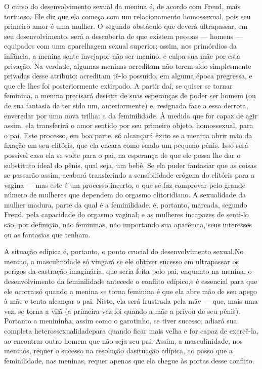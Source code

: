  O curso do desenvolvimento sexual da menina é, de acordo com Freud,
mais tortuoso. Ele diz que ela começa com um relacionamento
homossexual, pois seu primeiro amor é uma mulher. O segundo obstáculo
que deverá ultrapassar, em seu desenvolvimento, será a descoberta de
que existem pessoas --- homens --- equipados com uma aparelhagem sexual
superior; assim, nos primórdios da infância, a menina sente inveja\idxinvej[|(] por
não ser menino, e culpa sua mãe\idxmaesconf{} por esta privação. Na verdade, algumas
meninas acreditam não terem sido simplesmente privadas desse atributo:
acreditam tê-lo possuído, em alguma época pregressa, e que ele lhes foi
posteriormente extirpado. A partir daí, se quiser se tornar feminina, a
menina precisará desistir de suas esperanças de poder ser homem (ou de
sua fantasia de ter sido um, anteriormente) e, resignada face a essa
derrota, enveredar por uma nova trilha: a da feminilidade. À medida que
for capaz de agir assim, ela transferirá o amor sentido por seu
primeiro objeto, homossexual, para o pai. Este processo, em boa parte,
só alcançará êxito se a menina abrir mão da fixação em seu clitóris,\idxfeminfixa{} que ela encara como sendo um pequeno pênis. Isso será possível caso ela
se volte para o pai, na esperança de que ele possa lhe dar o substituto
ideal do pênis, qual seja, um bebê. Se ela puder fantasiar que as
coisas se passarão assim, acabará transferindo a sensibilidade erógena
do clitóris\idxclitfemi{} para a vagina --- mas este é um processo incerto, o que se
faz comprovar pelo grande número de mulheres que dependem do\idxvaginorg{} orgasmo\idxorgascli{} clitoridiano. A sexualidade da mulher madura, parte da qual é a
feminilidade, é, portanto, marcada, segundo Freud, pela capacidade do
orgasmo vaginal; e as mulheres incapazes de senti-lo são, por
definição, não femininas, não importando sua aparência, seus interesses
ou as fantasias que tenham.

 A situação edípica é, portanto, o ponto crucial do desenvolvimento
sexual.\idxrelpciden[|(] No menino, a masculinidade só vingará se ele obtiver sucesso em
ultrapassar os perigos da castração imaginária, que seria feita pelo
pai, enquanto na menina, o desenvolvimento da feminilidade antecede o
conflito edípico,\idxfeminconf[|(] e é essencial para que ele ocorra;\idxcastaconf[|)] só quando a menina
se torna feminina é que ela abre mão de seu apego à mãe e tenta
alcançar o pai. Nisto, ela será frustrada pela mãe --- que, mais uma
vez, se torna a vilã (a primeira vez foi quando a mãe a privou de seu
pênis). Portanto a menininha, assim como o garotinho, se tiver sucesso,
adiará sua completa heterossexualidade\idxconfehete[|(] para quando ficar mais velha e
for capaz de exercê-la, ao encontrar outro homem que não seja seu pai.
Assim, a masculinidade, nos meninos, requer o sucesso na resolução da\idxinvej[|)]
situação edípica, ao passo que a feminilidade, nas meninas, requer\idxconfemeni{} apenas que ela chegue às portas desse conflito.

